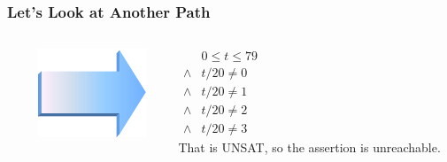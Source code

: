 
\begin{frame}
\frametitle{Let's Look at Another Path}

\begin{columns}
\begin{column}{.3\textwidth}
%
\end{column}
\begin{column}{.1\textwidth}
\pause\pause
\includegraphics[width=\textwidth]{arrow}
\end{column}
\begin{column}{.6\textwidth}
$\begin{array}{ll}
      & 0 \le t \le 79 \\
\land & t/20\not=0 \\
\land & t/20\not=1 \\
\land & t/20\not=2 \\
\land & t/20\not=3
\end{array}$\\[2ex]
\pause
That is UNSAT, so the assertion is unreachable.
\end{column}
\end{columns}

\end{frame}

